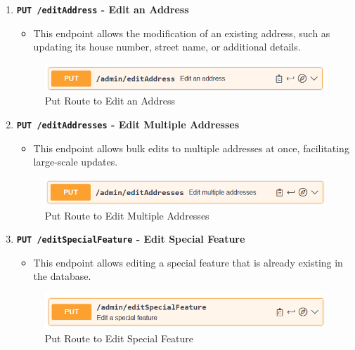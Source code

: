 \begin{enumerate}
        \item \textbf{\texttt{PUT /editAddress} - Edit an Address}
        \begin{itemize}
            \item This endpoint allows the modification of an existing address, such as updating its house number, street name, or additional details.
        \end{itemize} 
        \begin{figure} [H]
            \centering
            \includegraphics [width=1\textwidth] {images/andreas/praxis/editAddress.png}
            \caption{Put Route to Edit an Address}
        \end{figure}

        \item \textbf{\texttt{PUT /editAddresses} - Edit Multiple Addresses}
        \begin{itemize}
            \item This endpoint allows bulk edits to multiple addresses at once, facilitating large-scale updates.
        \end{itemize} 
        \begin{figure} [H]
            \centering
            \includegraphics [width=1\textwidth] {images/andreas/praxis/editAddresses.png}
            \caption{Put Route to Edit Multiple Addresses}
        \end{figure}

        \item \textbf{\texttt{PUT /editSpecialFeature} - Edit Special Feature}
        \begin{itemize}
            \item This endpoint allows editing a special feature that is already existing in the database.
        \end{itemize} 
        \begin{figure} [H]
            \centering
            \includegraphics [width=1\textwidth] {images/andreas/praxis/editSF.png}
            \caption{Put Route to Edit Special Feature}
        \end{figure}
    \end{enumerate}

